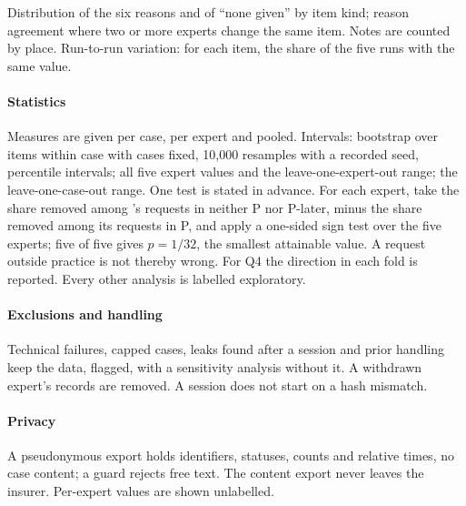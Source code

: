\begin{description}[leftmargin=1em,style=nextline,itemsep=1pt]
\item[Q5, reasons] Distribution of the six reasons and of ``none given'' by item kind; reason agreement where two or more experts change the same item. Notes are counted by place. Run-to-run variation: for each item, the share of the five runs with the same value.
\end{description}

\paragraph{Statistics}
Measures are given per case, per expert and pooled. Intervals: bootstrap over items within case with cases fixed, 10,000 resamples with a recorded seed, percentile intervals; all five expert values and the leave-one-expert-out range; the leave-one-case-out range. One test is stated in advance. For each expert, take the share removed among \casepath's requests in neither P nor P-later, minus the share removed among its requests in P, and apply a one-sided sign test over the five experts; five of five gives $p=1/32$, the smallest attainable value. A request outside practice is not thereby wrong. For Q4 the direction in each fold is reported. Every other analysis is labelled exploratory.

\paragraph{Exclusions and handling}
Technical failures, capped cases, leaks found after a session and prior handling keep the data, flagged, with a sensitivity analysis without it. A withdrawn expert's records are removed. A session does not start on a hash mismatch.

\paragraph{Privacy}
A pseudonymous export holds identifiers, statuses, counts and relative times, no case content; a guard rejects free text. The content export never leaves the insurer. Per-expert values are shown unlabelled.

